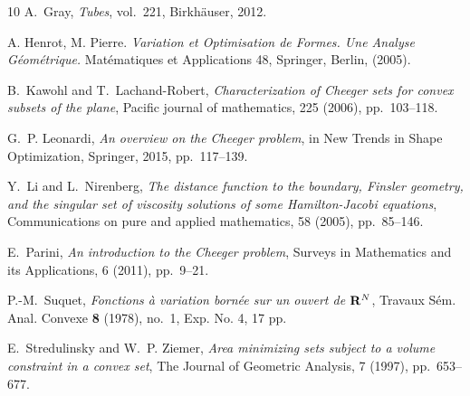 \documentclass[reqno,11pt]{amsart}
\theoremstyle{definition}
\numberwithin{equation}{section}
\newcommand{\1}{{{\bf 1}\kern-0,28em\rm l}}
\begin{document}
\begin{thebibliography}{10}
{\sc A.~Gray}, {\em Tubes}, vol.~221, Birkh{\"a}user, 2012.

 {\sc A. Henrot, M. Pierre}. {\em  Variation et Optimisation de Formes. Une Analyse G\'eom\'etrique.} Mat\'ematiques et
Applications 48, Springer, Berlin, (2005).

{\sc B.~Kawohl and T.~Lachand-Robert}, {\em Characterization of Cheeger sets
  for convex subsets of the plane}, Pacific journal of mathematics, 225 (2006),
  pp.~103--118.

{\sc G.~P. Leonardi}, {\em An overview on the Cheeger problem}, in New Trends
  in Shape Optimization, Springer, 2015, pp.~117--139.

{\sc Y.~Li and L.~Nirenberg}, {\em The distance function to the boundary,
  Finsler geometry, and the singular set of viscosity solutions of some
  Hamilton-Jacobi equations}, Communications on pure and applied mathematics,
  58 (2005), pp.~85--146.

{\sc E.~Parini}, {\em An introduction to the Cheeger problem}, Surveys in
  Mathematics and its Applications, 6 (2011), pp.~9--21.
  
  {\sc P.-M.~Suquet}, {\em Fonctions \`a{} variation born\'ee sur un ouvert de ${\bf R}\sp{N}$}, Travaux S\'em. Anal. Convexe {\bf 8} (1978), no.~1, Exp. No. 4, 17 pp.

{\sc E.~Stredulinsky and W.~P. Ziemer}, {\em Area minimizing sets subject to a
  volume constraint in a convex set}, The Journal of Geometric Analysis, 7
  (1997), pp.~653--677.

\end{thebibliography}
\end{document}
